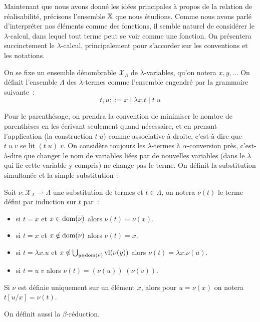 \documentclass{article}
\begin{document}
Maintenant que nous avons donné les idées principales à propos de la relation de réalisabilité, précisons l'ensemble $\mathbb X$ que nous étudions. Comme nous avons parlé d'interpréter nos éléments comme des fonctions, il semble naturel de considérer le $\lambda$-calcul, dans lequel tout terme peut se voir comme une fonction. On présentera succinctement le $\lambda$-calcul, principalement pour s'accorder sur les conventions et les notations.

\begin{defi}
    On se fixe un ensemble dénombrable $\mathcal X_\Lambda$ de $\lambda$-variables, qu'on notera $x,y,\ldots$ On définit l'ensemble $\Lambda$ des $\lambda$-termes comme l'ensemble engendré par la grammaire suivante~:
    \[t,u ::= x \mid \lambda x. t\mid t\;u\]
\end{defi}

Pour le parenthésage, on prendra la convention de minimiser le nombre de parenthèses en les écrivant seulement quand nécessaire, et en prenant l'application (la construction $t\;u$) comme associative à droite, c'est-à-dire que $t\;u\;v$ se lit $(t\;u)\;v$. On considère toujours les $\lambda$-termes à $\alpha$-conversion près, c'est-à-dire que changer le nom de variables liées par de nouvelles variables (dans le $\lambda$ qui lie cette variable y compris) ne change pas le terme. On définit la substitution simultanée et la simple substitution~:

\begin{defi}
    Soit $\nu : \mathcal X_\Lambda \rightharpoonup \Lambda$ une substitution de termes et $t\in \Lambda$, on notera $\nu(t)$ le terme défini par induction sur $t$ par~:
    \begin{itemize}
        \item si $t = x$ et $x \in \mathrm{dom}(\nu)$ alors $\nu(t) = \nu(x)$.
        \item si $t = x$ et $x\notin\mathrm{dom}(\nu)$ alors $\nu(t) = x$.
        \item si $t = \lambda x.u$ et $x\notin\bigcup_{y\in\mathrm{dom}(\nu)}\mathrm{vl}(\nu(y))$ alors $\nu(t) = \lambda x.\nu(u)$.
        \item si $t = u\;v$ alors $\nu(t) = (\nu(u))\;(\nu(v))$.
    \end{itemize}

    Si $\nu$ est définie uniquement sur un élément $x$, alors pour $u = \nu(x)$ on notera $t[u/x] = \nu(t)$.
\end{defi}

On définit aussi la $\beta$-réduction.
\end{document}
